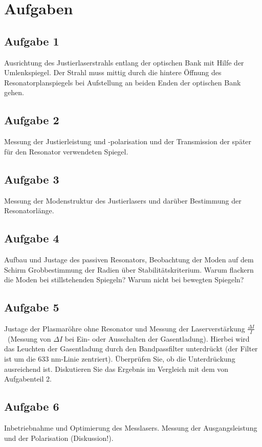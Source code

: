 \section{Aufgaben}

\subsection*{Aufgabe 1}
Ausrichtung des Justierlaserstrahls entlang der optischen Bank mit Hilfe der Umlenkspiegel. Der Strahl muss mittig durch die hintere Öffnung des Resonatorplanspiegels bei Aufstellung an beiden Enden der optischen Bank gehen.

\subsection*{Aufgabe 2}
Messung der Justierleistung und -polarisation und der Transmission der später für den Resonator verwendeten Spiegel.

\subsection*{Aufgabe 3}
Messung der Modenstruktur des Justierlasers und darüber Bestimmung der Resonatorlänge.

\subsection*{Aufgabe 4}
Aufbau und Justage des passiven Resonators, Beobachtung der Moden auf dem Schirm Grobbestimmung der Radien über Stabilitätskriterium. Warum flackern die Moden bei stillstehenden Spiegeln? Warum nicht bei bewegten Spiegeln?

\subsection*{Aufgabe 5}
Justage der Plasmaröhre ohne Resonator und Messung der Laserverstärkung \(\frac{\Delta I}{I}\)\ (Messung von \(\Delta I\) bei Ein- oder Ausschalten der Gasentladung). Hierbei wird das 
Leuchten der Gasentladung durch den Bandpassfilter unterdrückt (der Filter ist um die 633 nm-Linie zentriert). Überprüfen Sie, ob die Unterdrückung ausreichend ist. 
Diskutieren Sie das Ergebnis im Vergleich mit dem von Aufgabenteil 2. 

\subsection*{Aufgabe 6}
Inbetriebnahme und Optimierung des Messlasers. Messung der Ausgangsleistung und der Polarisation (Diskussion!). 

